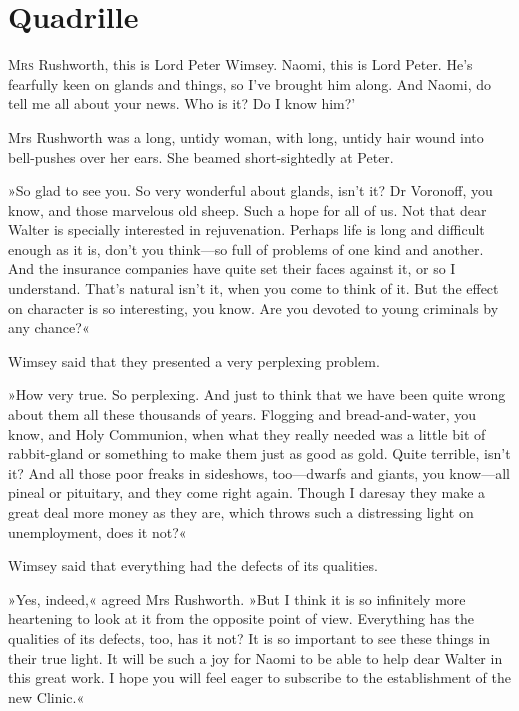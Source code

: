 \chapter{Quadrille}

\lettrine[lines=4,ante=‘]{M}{rs} Rushworth, this is Lord Peter Wimsey. Naomi, this is Lord Peter. He's fearfully keen on glands and things, so I've brought him along. And Naomi, do tell me all about your news. Who is it? Do I know him?'

Mrs Rushworth was a long, untidy woman, with long, untidy hair wound into bell-pushes over her ears. She beamed short-sightedly at Peter.

»So glad to see you. So very wonderful about glands, isn't it? Dr Voronoff, you know, and those marvelous old sheep. Such a hope for all of us. Not that dear Walter is specially interested in rejuvenation. Perhaps life is long and difficult enough as it is, don't you think\allowbreak---\allowbreak so full of problems of one kind and another. And the insurance companies have quite set their faces against it, or so I understand. That's natural isn't it, when you come to think of it. But the effect on character is so interesting, you know. Are you devoted to young criminals by any chance?«

Wimsey said that they presented a very perplexing problem.

»How very true. So perplexing. And just to think that we have been quite wrong about them all these thousands of years. Flogging and bread-and-water, you know, and Holy Communion, when what they really needed was a little bit of rabbit-gland or something to make them just as good as gold. Quite terrible, isn't it? And all those poor freaks in sideshows, too\allowbreak---\allowbreak dwarfs and giants, you know\allowbreak---\allowbreak all pineal or pituitary, and they come right again. Though I daresay they make a great deal more money as they are, which throws such a distressing light on unemployment, does it not?«

Wimsey said that everything had the defects of its qualities.

»Yes, indeed,« agreed Mrs Rushworth. »But I think it is so infinitely more heartening to look at it from the opposite point of view. Everything has the qualities of its defects, too, has it not? It is so important to see these things in their true light. It will be such a joy for Naomi to be able to help dear Walter in this great work. I hope you will feel eager to subscribe to the establishment of the new Clinic.«

